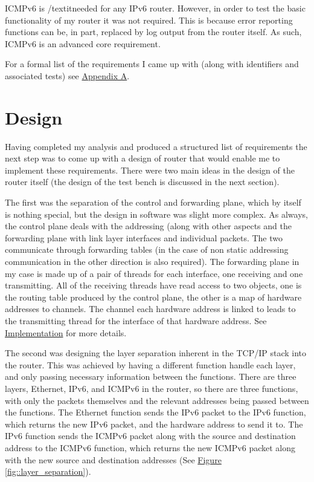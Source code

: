 \documentclass[12pt,a4paper,twoside,openright]{report}
\begin{document}
ICMPv6 is /textit{needed} for any IPv6 router.  However, in order to test the basic functionality of my router it was not required. This is because error reporting functions can be, in part, replaced by log output from the router itself. As such, ICMPv6 is an advanced core requirement.

\bigskip

For a formal list of the requirements I came up with (along with identifiers and associated tests) see \hyperref[appendix::requirements]{Appendix A}.

\section{Design}
\label{sec::design}

Having completed my analysis and produced a structured list of requirements the next step was to come up with a design of router that would enable me to implement these requirements.  There were two main ideas in the design of the router itself (the design of the test bench is discussed in the next section). 

\bigskip

The first was the separation of the control and forwarding plane, which by itself is nothing special, but the design in software was slight more complex.  As always, the control plane deals with the addressing (along with other aspects and the forwarding plane with link layer interfaces and individual packets.  The two communicate through forwarding tables (in the case of non static addressing communication in the other direction is also required). The forwarding plane in my case is made up of a pair of threads for each interface, one receiving and one transmitting. All of the receiving threads have read access to two objects, one is the routing table produced by the control plane, the other is a map of hardware addresses to channels.  The channel each hardware address is linked to leads to the transmitting thread for the interface of that hardware address. See \hyperref[chap::implementation]{Implementation} for more details.

\bigskip

The second was designing the layer separation inherent in the TCP/IP stack into the router.  This was achieved by having a different function handle each layer, and only passing necessary information between the functions.  There are three layers, Ethernet, IPv6, and ICMPv6 in the router, so there are three functions, with only the packets themselves and the relevant addresses being passed between the functions. The Ethernet function sends the IPv6 packet to the IPv6 function, which returns the new IPv6 packet, and the hardware address to send it to.  The IPv6 function sends the ICMPv6 packet along with the source and destination address to the ICMPv6 function, which returns the new ICMPv6 packet along with the new source and destination addresses (See \hyperref[fig::layer_separation]{Figure }\ref{fig::layer_separation}).
\end{document}
